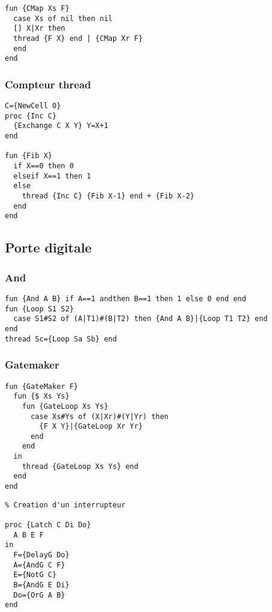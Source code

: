 \documentclass{report}
\begin{document}
\begin{lstlisting}[escapechar=\%]
fun {CMap Xs F} 
  case Xs of nil then nil 
  [] X|Xr then 
  thread {F X} end | {CMap Xr F}
  end
end
\end{lstlisting}

\subsubsection{Compteur thread}
\begin{lstlisting}[escapechar=\%]
C={NewCell 0} 
proc {Inc C} 
  {Exchange C X Y} Y=X+1
end

fun {Fib X} 
  if X==0 then 0 
  elseif X==1 then 1 
  else 
    thread {Inc C} {Fib X-1} end + {Fib X-2} 
  end
end
\end{lstlisting}

\subsection{Porte digitale}
\subsubsection*{And}
\begin{lstlisting}[escapechar=\%]
fun {And A B} if A==1 andthen B==1 then 1 else 0 end end 
fun {Loop S1 S2} 
  case S1#S2 of (A|T1)#(B|T2) then {And A B}|{Loop T1 T2} end
end
thread Sc={Loop Sa Sb} end
\end{lstlisting}
\subsubsection*{Gatemaker}
\begin{minipage}[t]{0.45\linewidth}
\begin{lstlisting}[escapechar=\%]
fun {GateMaker F} 
  fun {$ Xs Ys} 
    fun {GateLoop Xs Ys} 
      case Xs#Ys of (X|Xr)#(Y|Yr) then
        {F X Y}|{GateLoop Xr Yr}
      end 
    end 
  in 
    thread {GateLoop Xs Ys} end 
  end
end
\end{lstlisting}
\end{minipage}
%
\begin{minipage}[t]{0.45\linewidth}
\begin{lstlisting}
% Creation d'un interrupteur

proc {Latch C Di Do} 
  A B E F
in
  F={DelayG Do} 
  A={AndG C F} 
  E={NotG C} 
  B={AndG E Di} 
  Do={OrG A B}
end
\end{lstlisting}
\end{minipage}
\end{document}

